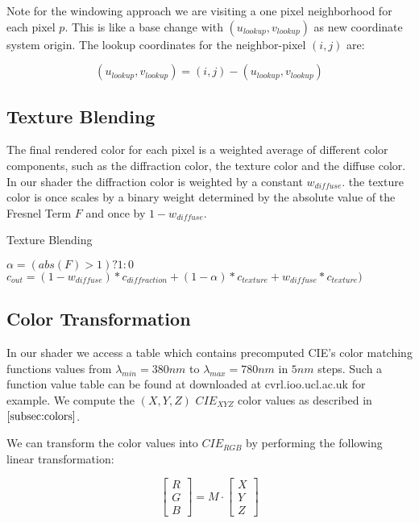 Note for the windowing approach we are visiting a one pixel neighborhood for each pixel $p$. 
This is like a base change with $(u_{lookup}, v_{lookup})$ as new coordinate system origin. The lookup coordinates for the neighbor-pixel $(i,j)$ are:

\begin{equation}
  (u_{lookup}, v_{lookup}) = (i,j)-(u_{lookup}, v_{lookup})
\label{eq:gaussianwindowlook}
\end{equation}

\subsection{Texture Blending}
The final rendered color for each pixel is a weighted average of different color components, such as the diffraction color, the texture color and the diffuse color. In our shader the diffraction color is weighted by a constant $w_{diffuse}$. the texture color is once scales by a binary weight determined by the absolute value of the Fresnel Term $F$ and once by $1-w_{diffuse}$. 

\begin{algorithm}[H]
  \caption{Texture Blending}
  \begin{algorithmic}
    \State $\alpha = (abs(F) > 1) ? 1 : 0$
    \State $c_{out} =(1-w_{diffuse})*c_{diffraction} + (1-\alpha)*c_{texture} + w_{diffuse}*c_{texture})$
  \end{algorithmic}
\end{algorithm}

\subsection{Color Transformation}
\label{subsec:colortransformations}

In our shader we access a table which contains precomputed CIE's color matching functions values from $\lambda_{min} = 380 nm$ to $\lambda_{max} = 780 nm$ in $5 nm$ steps. Such a function value table can be found at downloaded at cvrl.ioo.ucl.ac.uk for example. We compute the $(X,Y,Z)$ $CIE_{XYZ}$ color values as described in $\ref{subsec:colors}$. 


We can transform the color values into $CIE_{RGB}$ by performing the following linear transformation:

\begin{equation}
\begin{bmatrix}R\\G\\B\end{bmatrix} = M \cdot \begin{bmatrix}X\\Y\\Z\end{bmatrix}
\end{equation} 

